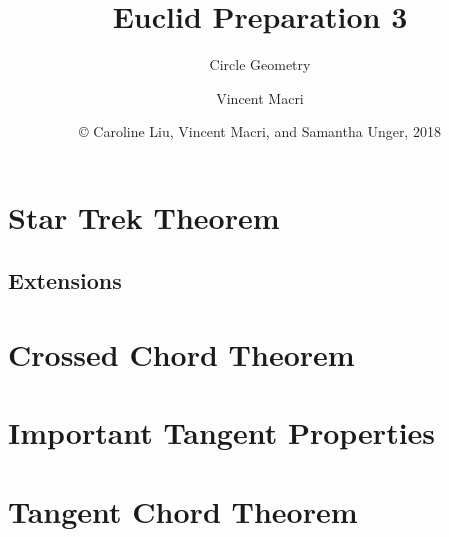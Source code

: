 

\usepackage{adjustbox}
\usepackage{wrapfig}
\usepackage{textpos}
\usepackage{tikz}
\usepackage{tkz-euclide}
\usetikzlibrary{angles,quotes}


\title{Euclid Preparation 3}
\subtitle{Circle Geometry}
\author{Vincent Macri}
\date{\copyright{} Caroline Liu, Vincent Macri, and Samantha Unger, 2018}


	\frame{\titlepage}
	\section{Star Trek Theorem}
		
		\subsection{Extensions}
			
			
			
			
			
	\section{Crossed Chord Theorem}
		
		
	\section{Important Tangent Properties}
		
	\section{Tangent Chord Theorem}
		
		

